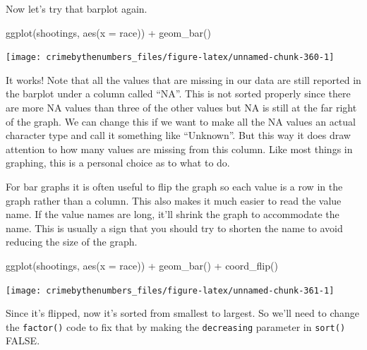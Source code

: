 \documentclass[
]{krantz}
\makeatletter
\newenvironment{Shaded}{\begin{snugshade}}{\end{snugshade}}
\newcommand{\AttributeTok}[1]{\textcolor[rgb]{0.61,0.61,0.61}{#1}}
\newcommand{\FunctionTok}[1]{\textcolor[rgb]{0,0,0}{#1}}
\newcommand{\NormalTok}[1]{#1}
\newcommand{\SpecialCharTok}[1]{\textcolor[rgb]{0,0,0}{#1}}
\newenvironment{kframe}{%
\medskip{}
\setlength{\fboxsep}{.8em}
 \def\at@end@of@kframe{}%
 \ifinner\ifhmode%
  \def\at@end@of@kframe{\end{minipage}}%
  \begin{minipage}{\columnwidth}%
 \fi\fi%
 \def\FrameCommand##1{\hskip\@totalleftmargin \hskip-\fboxsep
 \colorbox{shadecolor}{##1}\hskip-\fboxsep
     \hskip-\linewidth \hskip-\@totalleftmargin \hskip\columnwidth}%
 \MakeFramed {\advance\hsize-\width
   \@totalleftmargin\z@ \linewidth\hsize
   \@setminipage}}%
 {\par\unskip\endMakeFramed%
 \at@end@of@kframe}
\renewenvironment{Shaded}{\begin{kframe}}{\end{kframe}}
\makeatother
\begin{document}
Now let's try that barplot again.

\begin{Shaded}
\begin{Highlighting}[]
\FunctionTok{ggplot}\NormalTok{(shootings, }\FunctionTok{aes}\NormalTok{(}\AttributeTok{x =}\NormalTok{ race)) }\SpecialCharTok{+}
  \FunctionTok{geom\_bar}\NormalTok{()}
\end{Highlighting}
\end{Shaded}

\begin{center}\texttt{[image: crimebythenumbers\_files/figure-latex/unnamed-chunk-360-1]} \end{center}

It works! Note that all the values that are missing in our
data are still reported in the barplot under a column called
``NA''. This is not sorted properly since there are more NA
values than three of the other values but NA is still at the
far right of the graph. We can change this if we want to
make all the NA values an actual character type and call it
something like ``Unknown''. But this way it does draw
attention to how many values are missing from this column.
Like most things in graphing, this is a personal choice as
to what to do.

For bar graphs it is often useful to flip the graph so each
value is a row in the graph rather than a column. This also
makes it much easier to read the value name. If the value
names are long, it'll shrink the graph to accommodate the
name. This is usually a sign that you should try to shorten
the name to avoid reducing the size of the graph.

\begin{Shaded}
\begin{Highlighting}[]
\FunctionTok{ggplot}\NormalTok{(shootings, }\FunctionTok{aes}\NormalTok{(}\AttributeTok{x =}\NormalTok{ race)) }\SpecialCharTok{+}
  \FunctionTok{geom\_bar}\NormalTok{() }\SpecialCharTok{+}
  \FunctionTok{coord\_flip}\NormalTok{()}
\end{Highlighting}
\end{Shaded}

\begin{center}\texttt{[image: crimebythenumbers\_files/figure-latex/unnamed-chunk-361-1]} \end{center}

Since it's flipped, now it's sorted from smallest to
largest. So we'll need to change the \texttt{factor()} code
to fix that by making the \texttt{decreasing} parameter in
\texttt{sort()} FALSE.
\end{document}
